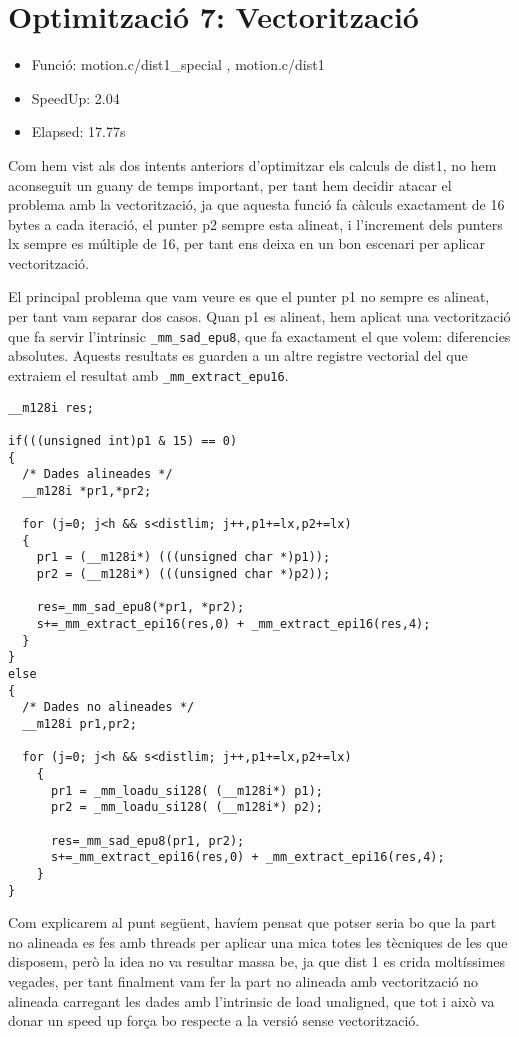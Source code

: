 \section{Optimitzaci\'o 7: Vectoritzaci\'o}
\begin{itemize}
\item{Funció: motion.c/dist1\_special , motion.c/dist1}
\item{SpeedUp: 2.04}
\item{Elapsed: 17.77s}
\end{itemize}

Com hem vist als dos intents anteriors d'optimitzar els calculs de dist1, no hem aconseguit un guany de temps important, per tant hem decidir atacar el problema amb la vectorització, ja que aquesta funció fa càlculs exactament de 16 bytes a cada iteració, el punter p2 sempre esta alineat, i l'increment dels punters lx sempre es múltiple de 16, per tant ens deixa en un bon escenari per aplicar vectorització.

El principal problema que vam veure es que el punter p1 no sempre es alineat, per tant vam separar dos casos. Quan p1 es alineat, hem aplicat una vectorització que fa servir l'intrinsic \texttt{\_mm\_sad\_epu8}, que fa exactament el que volem: diferencies absolutes. Aquests resultats es guarden a un altre registre vectorial del que extraiem el resultat amb \texttt{\_mm\_extract\_epu16}.

\begin{lstlisting}
__m128i res;  
 
if(((unsigned int)p1 & 15) == 0)
{
  /* Dades alineades */
  __m128i *pr1,*pr2;

  for (j=0; j<h && s<distlim; j++,p1+=lx,p2+=lx)
  {   
    pr1 = (__m128i*) (((unsigned char *)p1));
    pr2 = (__m128i*) (((unsigned char *)p2));
		
    res=_mm_sad_epu8(*pr1, *pr2);
    s+=_mm_extract_epi16(res,0) + _mm_extract_epi16(res,4);
  }
}
else
{
  /* Dades no alineades */
  __m128i pr1,pr2;

  for (j=0; j<h && s<distlim; j++,p1+=lx,p2+=lx)
	{  
	  pr1 = _mm_loadu_si128( (__m128i*) p1);
	  pr2 = _mm_loadu_si128( (__m128i*) p2);
		
	  res=_mm_sad_epu8(pr1, pr2);
	  s+=_mm_extract_epi16(res,0) + _mm_extract_epi16(res,4);
	}  
}   
\end{lstlisting}

Com explicarem al punt següent, havíem pensat que potser seria bo que la part no alineada es fes amb threads per aplicar una mica totes les tècniques de les que disposem, però la idea no va resultar massa be, ja que dist 1 es crida moltíssimes vegades, per tant finalment vam fer la part no alineada amb vectorització no alineada carregant les dades amb l'intrinsic de load unaligned, que tot i això va donar un speed up força bo respecte a la versió sense vectorització.

